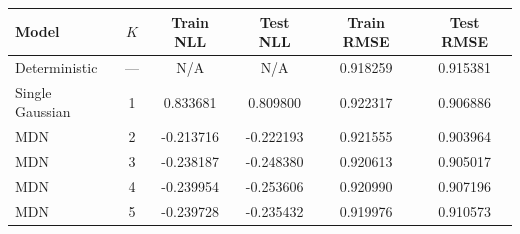 \begin{tabular}{lccccc}
  \toprule
  Model & $K$ & Train NLL & Test NLL & Train RMSE & Test RMSE \\
  \midrule
  Deterministic & --- & N/A & N/A & 0.918259 & 0.915381 \\
  Single Gaussian & 1 & 0.833681 & 0.809800 & 0.922317 & 0.906886 \\
  MDN & 2 & -0.213716 & -0.222193 & 0.921555 & 0.903964 \\
  MDN & 3 & -0.238187 & -0.248380 & 0.920613 & 0.905017 \\
  MDN & 4 & -0.239954 & -0.253606 & 0.920990 & 0.907196 \\
  MDN & 5 & -0.239728 & -0.235432 & 0.919976 & 0.910573 \\
  \bottomrule
\end{tabular}
